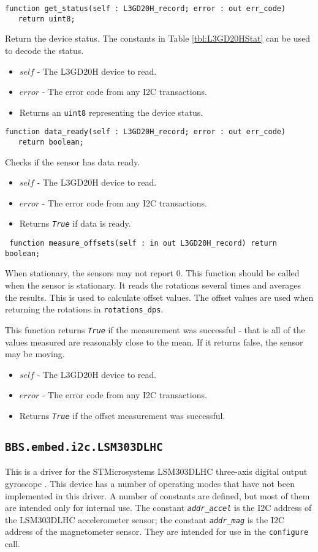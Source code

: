 \documentclass[10pt, openany]{book}
\newcommand{\package}[1]{\texttt{#1}}
\newcommand{\function}[1]{\texttt{#1}}
\newcommand{\constant}[1]{\emph{\texttt{#1}}}
\newcommand{\datatype}[1]{\texttt{#1}}
\begin{document}
\begin{lstlisting}
function get_status(self : L3GD20H_record; error : out err_code)
   return uint8;
\end{lstlisting}
Return the device status.  The constants in Table \ref{tbl:L3GD20HStat} can be used to decode the status.
\begin{itemize}
  \item $self$ - The L3GD20H device to read.
  \item $error$ - The error code from any I2C transactions.
  \item Returns an \datatype{uint8} representing the device status.
\end{itemize}

\begin{lstlisting}
function data_ready(self : L3GD20H_record; error : out err_code)
   return boolean;
\end{lstlisting}
Checks if the sensor has data ready.
\begin{itemize}
  \item $self$ - The L3GD20H device to read.
  \item $error$ - The error code from any I2C transactions.
  \item Returns \constant{True} if data is ready.
\end{itemize}

\begin{lstlisting}
 function measure_offsets(self : in out L3GD20H_record) return boolean;
\end{lstlisting}
When stationary, the sensors may not report 0.  This function should be called when the sensor is stationary.  It reads the rotations several times and averages the results.  This is used to calculate offset values.  The offset values are used when returning the rotations in \datatype{rotations\_dps}.

This function returns \constant{True} if the measurement was successful - that is all of the values measured are reasonably close to the mean.  If it returns false, the sensor may be moving.
\begin{itemize}
  \item $self$ - The L3GD20H device to read.
  \item $error$ - The error code from any I2C transactions.
  \item Returns \constant{True} if the offset measurement was successful.
\end{itemize}

\subsection{\package{BBS.embed.i2c.LSM303DLHC}}
This is a driver for the STMicrosystems LSM303DLHC three-axis digital output gyroscope \cite{LSM303DLHC}.  This device has a number of operating modes that have not been implemented in this driver.  A number of constants are defined, but most of them are intended only for internal use.  The constant \constant{addr\_accel} is the I2C address of the LSM303DLHC accelerometer sensor; the constant \constant{addr\_mag} is the I2C address of the magnetometer sensor.  They are intended for use in the \function{configure} call.
\end{document}
